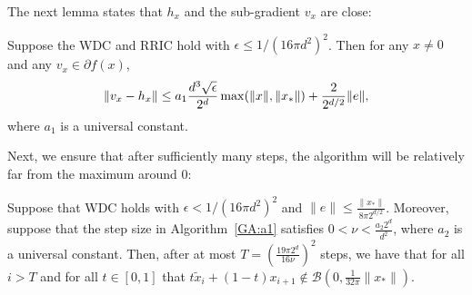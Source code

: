 
The next lemma states that $h_x$ and the sub-gradient $v_x$ are close:

\begin{lemma} \label{GA:le29}
Suppose the WDC and RRIC
hold with $\epsilon \leq 1 / (16 \pi d^2)^2$. Then for any $x\neq 0$ and any  $v_x \in {\partial f(x)}$,
\[
\|v_x - h_x\| \leq a_1 \frac{d^3 \sqrt{\epsilon}}{2^d} \max ( \|x\|, \| x_*\|) + \frac{2}{2^{d/2}} \|e\|,
\]
where $a_1$ is a universal constant.
\end{lemma}

Next, we ensure that after sufficiently many steps, the algorithm will be relatively far from the maximum around $0$:

\begin{lemma} \label{GA:le28}
Suppose that WDC holds with $\epsilon < 1/ (16 \pi d^2)^2$ and $\|e\| \leq \frac{\|x_*\|}{8\pi 2^{d/2}}$.
Moreover, suppose that the step size in Algorithm~\ref{GA:a1} satisfies $0< \nu  < \frac{a_2 2^d}{d^2}$, where $a_2$ is a universal constant.
Then, after at most $T = (\frac{19 \pi 2^d}{16 \nu})^2$ steps, we have that for all $i>T$
and for all $t \in [0, 1]$ that
$t \tilde{x}_i + (1 - t) x_{i + 1} \notin \mathcal B(0, \frac{1}{32\pi} \|x_*\|)$.
\end{lemma}

